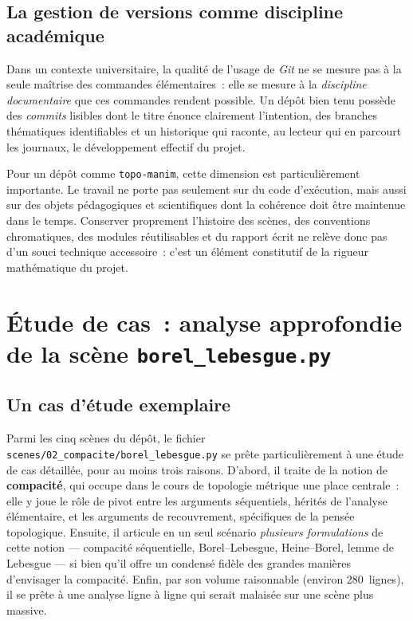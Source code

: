 \documentclass[12pt, a4paper, openany]{report}
\begin{document}
	\section{La gestion de versions comme discipline académique}

	Dans un contexte universitaire, la qualité de l’usage de \textit{Git} ne se mesure pas à la seule maîtrise des commandes élémentaires~: elle se mesure à la \emph{discipline documentaire} que ces commandes rendent possible. Un dépôt bien tenu possède des \textit{commits} lisibles dont le titre énonce clairement l’intention, des branches thématiques identifiables et un historique qui raconte, au lecteur qui en parcourt les journaux, le développement effectif du projet.

	Pour un dépôt comme \texttt{topo-manim}, cette dimension est particulièrement importante. Le travail ne porte pas seulement sur du code d’exécution, mais aussi sur des objets pédagogiques et scientifiques dont la cohérence doit être maintenue dans le temps. Conserver proprement l’histoire des scènes, des conventions chromatiques, des modules réutilisables et du rapport écrit ne relève donc pas d’un souci technique accessoire~: c’est un élément constitutif de la rigueur mathématique du projet.
	
	\chapter[Étude de cas]{Étude de cas~: analyse approfondie\\de la scène \texttt{borel\_lebesgue.py}}\label{chap:etude_compacite}

	\section{Un cas d’étude exemplaire}

	Parmi les cinq scènes du dépôt, le fichier \texttt{scenes/02\_compacite/borel\_lebesgue.py} se prête particulièrement à une étude de cas détaillée, pour au moins trois raisons. D’abord, il traite de la notion de \textbf{compacité}, qui occupe dans le cours de topologie métrique une place centrale~: elle y joue le rôle de pivot entre les arguments séquentiels, hérités de l’analyse élémentaire, et les arguments de recouvrement, spécifiques de la pensée topologique. Ensuite, il articule en un seul scénario \emph{plusieurs formulations} de cette notion — compacité séquentielle, Borel--Lebesgue, Heine--Borel, lemme de Lebesgue — si bien qu’il offre un condensé fidèle des grandes manières d’envisager la compacité. Enfin, par son volume raisonnable (environ 280~lignes), il se prête à une analyse ligne à ligne qui serait malaisée sur une scène plus massive.
\end{document}
